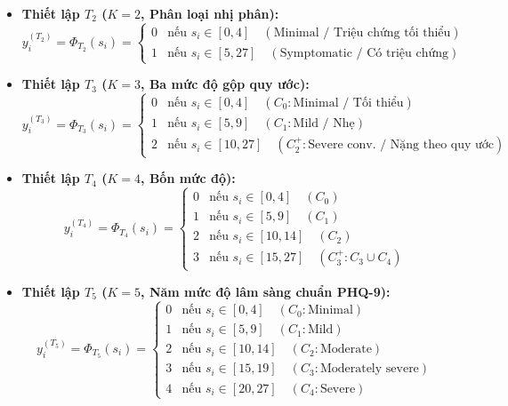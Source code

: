 \begin{itemize}
    \item \textbf{Thiết lập $T_2$ ($K=2$, Phân loại nhị phân):}
    \begin{equation}
        y^{(T_2)}_i = \Phi_{T_2}(s_i) = \begin{cases} 0 & \text{nếu } s_i \in [0, 4] \quad (\text{Minimal / Triệu chứng tối thiểu}) \\ 1 & \text{nếu } s_i \in [5, 27] \quad (\text{Symptomatic / Có triệu chứng}) \end{cases}
    \end{equation}
    \item \textbf{Thiết lập $T_3$ ($K=3$, Ba mức độ gộp quy ước):}
    \begin{equation}
        y^{(T_3)}_i = \Phi_{T_3}(s_i) = \begin{cases} 0 & \text{nếu } s_i \in [0, 4] \quad (C_0: \text{Minimal / Tối thiểu}) \\ 1 & \text{nếu } s_i \in [5, 9] \quad (C_1: \text{Mild / Nhẹ}) \\ 2 & \text{nếu } s_i \in [10, 27] \quad (C_2^+: \text{Severe conv. / Nặng theo quy ước}) \end{cases}
    \end{equation}
    \item \textbf{Thiết lập $T_4$ ($K=4$, Bốn mức độ):}
    \begin{equation}
        y^{(T_4)}_i = \Phi_{T_4}(s_i) = \begin{cases} 0 & \text{nếu } s_i \in [0, 4] \quad (C_0) \\ 1 & \text{nếu } s_i \in [5, 9] \quad (C_1) \\ 2 & \text{nếu } s_i \in [10, 14] \quad (C_2) \\ 3 & \text{nếu } s_i \in [15, 27] \quad (C_3^+: C_3 \cup C_4) \end{cases}
    \end{equation}
    \item \textbf{Thiết lập $T_5$ ($K=5$, Năm mức độ lâm sàng chuẩn PHQ-9):}
    \begin{equation}
        y^{(T_5)}_i = \Phi_{T_5}(s_i) = \begin{cases} 0 & \text{nếu } s_i \in [0, 4] \quad (C_0: \text{Minimal}) \\ 1 & \text{nếu } s_i \in [5, 9] \quad (C_1: \text{Mild}) \\ 2 & \text{nếu } s_i \in [10, 14] \quad (C_2: \text{Moderate}) \\ 3 & \text{nếu } s_i \in [15, 19] \quad (C_3: \text{Moderately severe}) \\ 4 & \text{nếu } s_i \in [20, 27] \quad (C_4: \text{Severe}) \end{cases}
    \end{equation}
\end{itemize}

